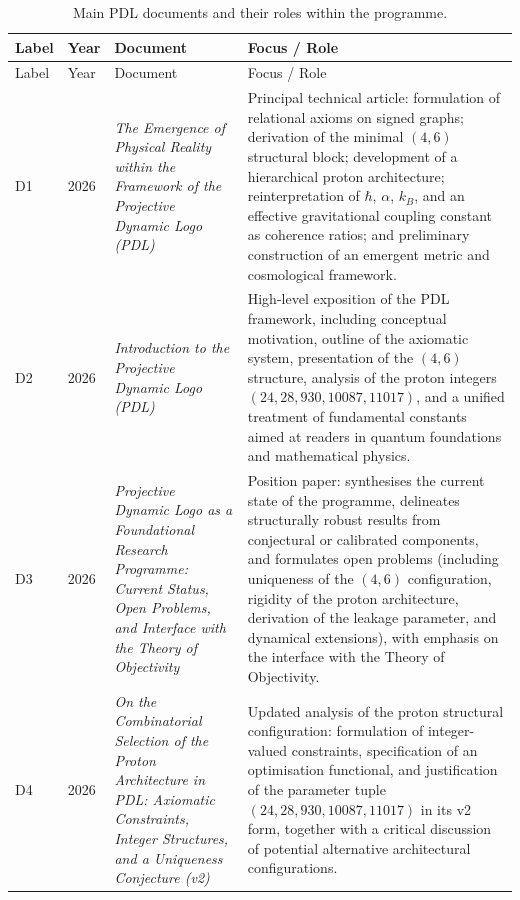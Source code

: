 \documentclass{article}
\begin{document}
\begin{longtable}{@{}llL{4cm}p{9.5cm}@{}}
\caption{Main PDL documents and their roles within the programme.}
\label{tab:documents}\\
\toprule
Label & Year & Document & Focus / Role \\
\midrule
\endfirsthead

\toprule
Label & Year & Document & Focus / Role \\
\midrule
\endhead

D1 & 2026 & \textit{The Emergence of Physical Reality within the Framework of the Projective Dynamic Logo (PDL)} &
Principal technical article: formulation of relational axioms on signed graphs; derivation of the minimal $(4,6)$ structural block; development of a hierarchical proton architecture; reinterpretation of $\hbar$, $\alpha$, $k_B$, and an effective gravitational coupling constant as coherence ratios; and preliminary construction of an emergent metric and cosmological framework. \citep{PDL_Main_2026} \\[0.5em]

D2 & 2026 & \textit{Introduction to the Projective Dynamic Logo (PDL)} &
High-level exposition of the PDL framework, including conceptual motivation, outline of the axiomatic system, presentation of the $(4,6)$ structure, analysis of the proton integers $(24,28,930,10087,11017)$, and a unified treatment of fundamental constants aimed at readers in quantum foundations and mathematical physics. \citep{PDL_intro} \\[0.5em]

D3 & 2026 & \textit{Projective Dynamic Logo as a Foundational Research Programme: Current Status, Open Problems, and Interface with the Theory of Objectivity} &
Position paper: synthesises the current state of the programme, delineates structurally robust results from conjectural or calibrated components, and formulates open problems (including uniqueness of the $(4,6)$ configuration, rigidity of the proton architecture, derivation of the leakage parameter, and dynamical extensions), with emphasis on the interface with the Theory of Objectivity. \citep{PDL_position,PDL_TO_dialogue} \\[0.5em]

D4 & 2026 & \textit{On the Combinatorial Selection of the Proton Architecture in PDL: Axiomatic Constraints, Integer Structures, and a Uniqueness Conjecture (v2)} &
Updated analysis of the proton structural configuration: formulation of integer-valued constraints, specification of an optimisation functional, and justification of the parameter tuple $(24,28,930,10087,11017)$ in its v2 form, together with a critical discussion of potential alternative architectural configurations. \citep{Combinatorial_Proton_v2_2026} \\[0.5em]


\end{longtable}
\end{document}
